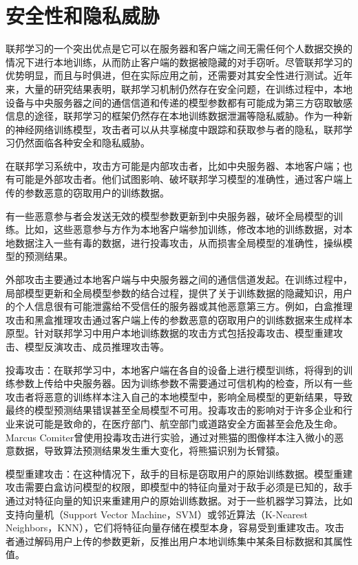 \section{安全性和隐私威胁}
联邦学习的一个突出优点是它可以在服务器和客户端之间无需任何个人数据交换的情况下进行本地训练，从而防止客户端的数据被隐藏的对手窃听。尽管联邦学习的优势明显，而且与时俱进，但在实际应用之前，还需要对其安全性进行测试。近年来，大量的研究结果表明，联邦学习机制仍然存在安全问题，在训练过程中，本地设备与中央服务器之间的通信信道和传递的模型参数都有可能成为第三方窃取敏感信息的途径，联邦学习的框架仍然存在本地训练数据泄漏等隐私威胁。作为一种新的神经网络训练模型，攻击者可以从共享梯度中跟踪和获取参与者的隐私，联邦学习仍然面临各种安全和隐私威胁。

在联邦学习系统中，攻击方可能是内部攻击者，比如中央服务器、本地客户端；也有可能是外部攻击者。他们试图影响、破坏联邦学习模型的准确性，通过客户端上传的参数恶意的窃取用户的训练数据。

有一些恶意参与者会发送无效的模型参数更新到中央服务器，破坏全局模型的训练。比如，这些恶意参与方作为本地客户端参加训练，修改本地的训练数据，对本地数据注入一些有毒的数据，进行投毒攻击，从而损害全局模型的准确性，操纵模型的预测结果。

外部攻击主要通过本地客户端与中央服务器之间的通信信道发起。在训练过程中，局部模型更新和全局模型参数的结合过程，提供了关于训练数据的隐藏知识，用户的个人信息很有可能泄露给不受信任的服务器或其他恶意第三方。例如，白盒推理攻击和黑盒推理攻击通过客户端上传的参数恶意的窃取用户的训练数据来生成样本原型。针对联邦学习中用户本地训练数据的攻击方式包括投毒攻击、模型重建攻击、模型反演攻击、成员推理攻击等。

投毒攻击：在联邦学习中，本地客户端在各自的设备上进行模型训练，将得到的训练参数上传给中央服务器。因为训练参数不需要通过可信机构的检查，所以有一些攻击者将恶意的训练样本注入自己的本地模型中，影响全局模型的更新结果，导致最终的模型预测结果错误甚至全局模型不可用。投毒攻击的影响对于许多企业和行业来说可能是致命的，在医疗部门、航空部门或道路安全方面甚至会危及生命。Marcus Comiter曾使用投毒攻击进行实验，通过对熊猫的图像样本注入微小的恶意数据，导致算法预测结果发生重大变化，将熊猫识别为长臂猿。

模型重建攻击：在这种情况下，敌手的目标是窃取用户的原始训练数据。模型重建攻击需要白盒访问模型的权限，即模型中的特征向量对于敌手必须是已知的，敌手通过对特征向量的知识来重建用户的原始训练数据。对于一些机器学习算法，比如支持向量机（Support Vector Machine，SVM）或邻近算法（K-Nearest Neighbors，KNN），它们将特征向量存储在模型本身，容易受到重建攻击。攻击者通过解码用户上传的参数更新，反推出用户本地训练集中某条目标数据和其属性值。

